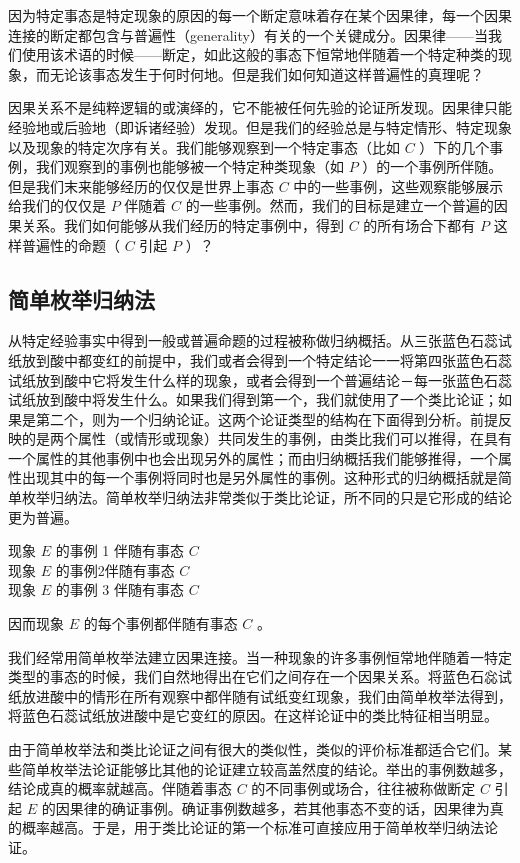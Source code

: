 因为特定事态是特定现象的原因的每一个断定意味着存在某个因果律，每一个因果连接的断定都包含与普遍性（generality）有关的一个关键成分。因果律——当我们使用该术语的时候——断定，如此这般的事态下恒常地伴随着一个特定种类的现象，而无论该事态发生于何时何地。但是我们如何知道这样普遍性的真理呢？

因果关系不是纯粹逻辑的或演绎的，它不能被任何先验的论证所发现。因果律只能经验地或后验地（即诉诸经验）发现。但是我们的经验总是与特定情形、特定现象以及现象的特定次序有关。我们能够观察到一个特定事态（比如 $C$ ）下的几个事例，我们观察到的事例也能够被一个特定种类现象（如 $P$ ）的一个事例所伴随。但是我们末来能够经历的仅仅是世界上事态 $C$ 中的一些事例，这些观察能够展示给我们的仅仅是 $P$ 伴随着 $C$ 的一些事例。然而，我们的目标是建立一个普遍的因果关系。我们如何能够从我们经历的特定事例中，得到 $C$ 的所有场合下都有 $P$ 这样普遍性的命题（ $C$ 引起 $P$ ）？

\subsection{简单枚举归纳法}

从特定经验事实中得到一般或普遍命题的过程被称做归纳概括。从三张蓝色石蕊试纸放到酸中都变红的前提中，我们或者会得到一个特定结论一一将第四张蓝色石蕊试纸放到酸中它将发生什么样的现象，或者会得到一个普遍结论－每一张蓝色石蕊试纸放到酸中将发生什么。如果我们得到第一个，我们就使用了一个类比论证；如果是第二个，则为一个归纳论证。这两个论证类型的结构在下面得到分析。前提反映的是两个属性（或情形或现象）共同发生的事例，由类比我们可以推得，在具有一个属性的其他事例中也会出现另外的属性；而由归纳概括我们能够推得，一个属性出现其中的每一个事例将同时也是另外属性的事例。这种形式的归纳概括就是简单枚举归纳法。简单枚举归纳法非常类似于类比论证，所不同的只是它形成的结论更为普遍。

\begin{displayquote}
现象 $E$ 的事例 1 伴随有事态 $C$\\
现象 $E$ 的事例2伴随有事态 $C$\\
现象 $E$ 的事例 3 伴随有事态 $C$
\end{displayquote}

因而现象 $E$ 的每个事例都伴随有事态 $C$ 。

我们经常用简单枚举法建立因果连接。当一种现象的许多事例恒常地伴随着一特定类型的事态的时候，我们自然地得出在它们之间存在一个因果关系。将蓝色石惢试纸放进酸中的情形在所有观察中都伴随有试纸变红现象，我们由简单枚举法得到，将蓝色石蕊试纸放进酸中是它变红的原因。在这样论证中的类比特征相当明显。

由于简单枚举法和类比论证之间有很大的类似性，类似的评价标准都适合它们。某些简单枚举法论证能够比其他的论证建立较高盖然度的结论。举出的事例数越多，结论成真的概率就越高。伴随着事态 $C$ 的不同事例或场合，往往被称做断定 $C$ 引起 $E$ 的因果律的确证事例。确证事例数越多，若其他事态不变的话，因果律为真的概率越高。于是，用于类比论证的第一个标准可直接应用于简单枚举归纳法论证。

